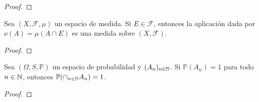 \begin{proof}
\end{proof}

\begin{statement}{12}
  Sea $(X, \mathcal{F}, \mu)$ un espacio de medida. Si $E \in \mathcal{F}$, entonces la aplicaci\'on dada por $\nu(A) = \mu(A \cap E)$ es una medida sobre $(X, \mathcal{F})$.
\end{statement}

\begin{proof}
\end{proof}

\begin{statement}{13}
  Sea $(\Omega, S, \mathbb{P})$ un espacio de probabilidad y $(A_n)_{n \in \mathbb N}$. Si $\mathbb{P}(A_n) = 1$ para todo $n \in \mathbb N$, entonces $\mathbb{P}(\cap_{n \in \mathbb N} A_n) = 1$.
\end{statement}

\begin{proof}
\end{proof}

